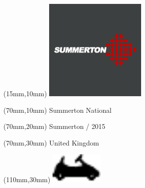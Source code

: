 \null\newpage
\begin{textblock*}{50mm}(15mm,10mm)%
\includegraphics[width=50mm]{LG/SUMM.png}
\end{textblock*}
\begin{textblock*}{130mm}(70mm,10mm)%
{\fontsize{20}{20}\selectfont Summerton National}\\
\end{textblock*}
\begin{textblock*}{120mm}(70mm,20mm)%
{\fontsize{16}{16}\selectfont Summerton / 2015}\\
\end{textblock*}
\begin{textblock*}{120mm}(70mm,30mm)%
{\fontsize{12}{12}\selectfont United Kingdom}
\end{textblock*}
\begin{textblock*}{30mm}(110mm,30mm)%
\centering
\includegraphics[height=15mm]{icons/kart.pdf}
\end{textblock*}

